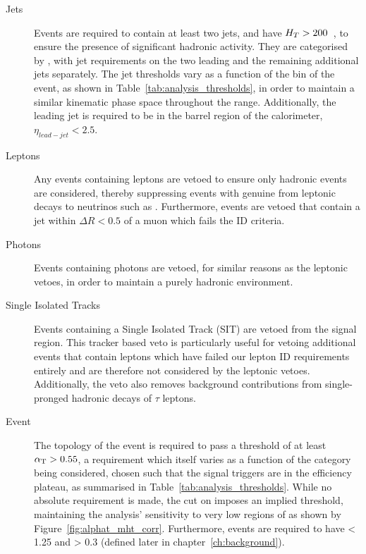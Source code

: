 \begin{description}
\item[Jets]
Events are required to contain at least two jets, and have
$H_T > 200$~\gev, to ensure the presence of significant hadronic activity.
They are categorised by \HT, with jet \Pt
requirements on the two leading and the remaining additional jets separately.
The jet \Pt thresholds vary as a function of the \HT bin of the event, as shown in
Table~\ref{tab:analysis_thresholds}, in order to maintain a similar kinematic
phase space throughout the \HT range. Additionally, the leading jet is required to be
in the barrel region of the calorimeter, $\eta_{lead-jet} < 2.5$.

\item[Leptons]
Any events containing leptons are vetoed to ensure only hadronic events
are considered, thereby suppressing events with genuine \met from leptonic decays to
neutrinos such as \wlnu. Furthermore, events are vetoed that contain a jet within
$\Delta R < 0.5$ of a muon which fails the ID criteria. 

\item[Photons]
Events containing photons are vetoed, for similar reasons as the leptonic 
vetoes, in order to maintain a purely hadronic environment.

\item[Single Isolated Tracks]
Events containing a Single Isolated Track (SIT) are vetoed from the signal 
region. This tracker based veto is particularly useful for vetoing additional events 
that contain leptons which have failed our lepton ID requirements entirely and 
are therefore not considered by the leptonic vetoes. Additionally, the veto also
removes background contributions from single-pronged hadronic decays of $\tau$
leptons.

\item[Event]
The topology of the event is required to pass a threshold of at least $\alpha_{\text{T}} >
0.55$, a requirement which itself varies as a function of the \HT category being
considered, chosen such that the signal triggers are in the efficiency
plateau, as summarised in Table~\ref{tab:analysis_thresholds}. While no
absolute \met requirement is made, the cut on
\alphat imposes an implied threshold, maintaining the analysis'
sensitivity to very low regions of \met as shown by Figure~\ref{fig:alphat_mht_corr}.
Furthermore, events are required to have
\mhtmet < 1.25 and \mindphistar > 0.3 (defined later in
chapter~\ref{ch:background}).

\end{description}


